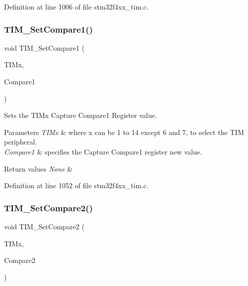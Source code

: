 Definition at line 1006 of file stm32f4xx\+\_\+tim.\+c.

\mbox{\label{group___t_i_m___group2_ga48631e66c32bb905946664f4722b2546}} 
\subsubsection{\texorpdfstring{T\+I\+M\+\_\+\+Set\+Compare1()}{TIM\_SetCompare1()}}
{\footnotesize\ttfamily void T\+I\+M\+\_\+\+Set\+Compare1 (\begin{DoxyParamCaption}\item[{\hyperlink{struct_t_i_m___type_def}{T\+I\+M\+\_\+\+Type\+Def} $\ast$}]{T\+I\+Mx,  }\item[{uint32\+\_\+t}]{Compare1 }\end{DoxyParamCaption})}



Sets the T\+I\+Mx Capture Compare1 Register value. 


\begin{DoxyParams}{Parameters}
{\em T\+I\+Mx} & where x can be 1 to 14 except 6 and 7, to select the T\+IM peripheral. \\
\hline
{\em Compare1} & specifies the Capture Compare1 register new value. \\
\hline
\end{DoxyParams}

\begin{DoxyRetVals}{Return values}
{\em None} & \\
\hline
\end{DoxyRetVals}


Definition at line 1052 of file stm32f4xx\+\_\+tim.\+c.

\mbox{\label{group___t_i_m___group2_ga3de36754f3ba5d46b9ef2bf8e77575c7}} 
\subsubsection{\texorpdfstring{T\+I\+M\+\_\+\+Set\+Compare2()}{TIM\_SetCompare2()}}
{\footnotesize\ttfamily void T\+I\+M\+\_\+\+Set\+Compare2 (\begin{DoxyParamCaption}\item[{\hyperlink{struct_t_i_m___type_def}{T\+I\+M\+\_\+\+Type\+Def} $\ast$}]{T\+I\+Mx,  }\item[{uint32\+\_\+t}]{Compare2 }\end{DoxyParamCaption})}



